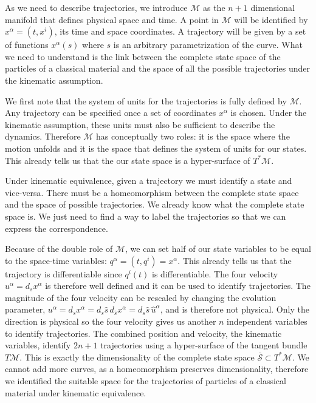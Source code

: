 \documentclass[aps,pra,10pt,twocolumn,floatfix,nofootinbib]{revtex4-1}
\numberwithin{equation}{section}
\theoremstyle{definition}
\begin{document}
As we need to describe trajectories, we introduce $\mathcal{M}$ as the $n+1$ dimensional manifold that defines physical space and time. A point in $\mathcal{M}$ will be identified by $x^\alpha = (t, x^i)$, its time and space coordinates. A trajectory will be given by a set of functions $x^\alpha(s)$ where $s$ is an arbitrary parametrization of the curve. What we need to understand is the link between the complete state space of the particles of a classical material and the space of all the possible trajectories under the kinematic assumption.

We first note that the system of units for the trajectories is fully defined by $\mathcal{M}$. Any trajectory can be specified once a set of coordinates $x^\alpha$ is chosen. Under the kinematic assumption, these units must also be sufficient to describe the dynamics. Therefore $\mathcal{M}$ has conceptually two roles: it is the space where the motion unfolds and it is the space that defines the system of units for our states. This already tells us that the our state space is a hyper-surface of $T^*\mathcal{M}$.

Under kinematic equivalence, given a trajectory we must identify a state and vice-versa. There must be a homeomorphism between the complete state space and the space of possible trajectories. We already know what the complete state space is. We just need to find a way to label the trajectories so that we can express the correspondence.

Because of the double role of $\mathcal{M}$, we can set half of our state variables to be equal to the space-time variables: $q^\alpha = (t, q^i) = x^\alpha$. This already tells us that the trajectory is differentiable since $q^i(t)$ is differentiable. The four velocity $u^\alpha = d_s x^\alpha$ is therefore well defined and it can be used to identify trajectories. The magnitude of the four velocity can be rescaled by changing the evolution parameter, $u^\alpha = d_s x^\alpha = d_s \hat{s} \, d_{\hat{s}} x^\alpha = d_s \hat{s} \, \hat{u}^\alpha$, and is therefore not physical. Only the direction is physical so the four velocity gives us another $n$ independent variables to identify trajectories. The combined position and velocity, the kinematic variables, identify $2n + 1$ trajectories using a hyper-surface of the tangent bundle $T\mathcal{M}$. This is exactly the dimensionality of the complete state space $\bar{\mathcal{S}} \subset T^*\mathcal{M}$. We cannot add more curves, as a homeomorphism preserves dimensionality, therefore we identified the suitable space for the trajectories of particles of a classical material under kinematic equivalence.
\end{document}
